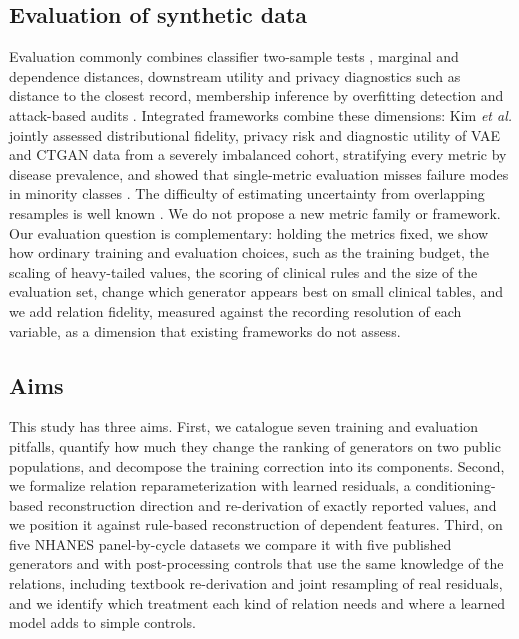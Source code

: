 \documentclass[pdflatex,referee]{sn-jnl}%
\begin{document}
\subsection*{Evaluation of synthetic data}

Evaluation commonly combines classifier two-sample tests \cite{lopezpaz2017c2st}, marginal and dependence distances, downstream utility and privacy diagnostics such as distance to the closest record, membership inference by overfitting detection \cite{vanbreugel2023domias} and attack-based audits \cite{giomi2023anonymeter}. Integrated frameworks combine these dimensions: Kim \textit{et al.} jointly assessed distributional fidelity, privacy risk and diagnostic utility of VAE and CTGAN data from a severely imbalanced cohort, stratifying every metric by disease prevalence, and showed that single-metric evaluation misses failure modes in minority classes \cite{kim2026integrated}. The difficulty of estimating uncertainty from overlapping resamples is well known \cite{bengio2004variance}. We do not propose a new metric family or framework. Our evaluation question is complementary: holding the metrics fixed, we show how ordinary training and evaluation choices, such as the training budget, the scaling of heavy-tailed values, the scoring of clinical rules and the size of the evaluation set, change which generator appears best on small clinical tables, and we add relation fidelity, measured against the recording resolution of each variable, as a dimension that existing frameworks do not assess.

\subsection*{Aims}

This study has three aims. First, we catalogue seven training and evaluation pitfalls, quantify how much they change the ranking of generators on two public populations, and decompose the training correction into its components. Second, we formalize relation reparameterization with learned residuals, a conditioning-based reconstruction direction and re-derivation of exactly reported values, and we position it against rule-based reconstruction of dependent features. Third, on five NHANES panel-by-cycle datasets we compare it with five published generators and with post-processing controls that use the same knowledge of the relations, including textbook re-derivation and joint resampling of real residuals, and we identify which treatment each kind of relation needs and where a learned model adds to simple controls.
\end{document}
